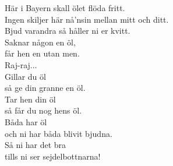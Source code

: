 \documentclass[a6paper, 10pt, twoside]{article}
\begin{document}
\noindent
{}
\small
\begin{center}
\end{center}
\begin{lyrics}
Här i Bayern skall ölet flöda fritt. \\
Ingen skiljer här nå'nsin mellan mitt och ditt. \\
Bjud varandra så håller ni er kvitt. \\
Saknar någon en öl, \\
får hen en utan men. \\
\newline
Raj-raj... \\
\newline
Gillar du öl \\
så ge din granne en öl. \\
Tar hen din öl \\
så får du nog hens öl. \\
Båda har öl \\
och ni har båda blivit bjudna. \\
Så ni har det bra \\
tills ni ser sejdelbottnarna! 
\end{lyrics}
\end{document}
